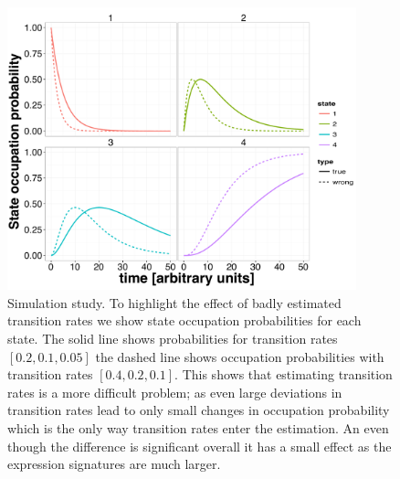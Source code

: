 \begin{figure}
  \centering
  \includegraphics[width=0.9\textwidth]{pics/wrong_w.pdf}
  \caption{Simulation study. To highlight the effect of badly estimated transition rates we show state occupation probabilities for each state. The solid line shows probabilities for transition rates $[0.2, 0.1, 0.05]$ the dashed line shows occupation probabilities with transition rates $[0.4, 0.2, 0.1]$. This shows  that estimating transition rates is a more difficult problem; as even large deviations in transition rates lead to only small changes in occupation probability which is the only way transition rates enter the estimation. An even though the difference is significant overall it has a small effect as the expression signatures are much larger. }
  \label{fig:wrong_w}
\end{figure}






